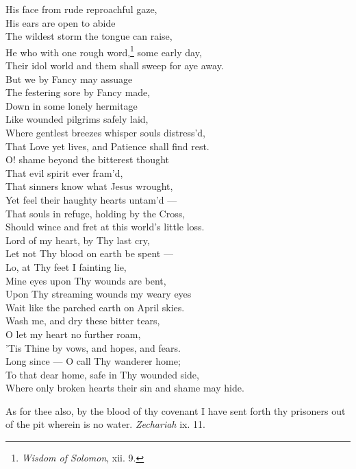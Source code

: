  His face from rude reproachful gaze, \\
 His ears are open to abide \\
 The wildest storm the tongue can raise, \\
 He who with one rough word,\footnote{\emph{Wisdom of Solomon}, xii. 9.} some early day, \\
 Their idol world and them shall sweep for aye away. \\
  But we by Fancy may assuage \\
 The festering sore by Fancy made, \\
 Down in some lonely hermitage \\
 Like wounded pilgrims safely laid, \\
 Where gentlest breezes whisper souls distress’d, \\
 That Love yet lives, and Patience shall find rest. \\
  O! shame beyond the bitterest thought \\
 That evil spirit ever fram’d, \\
 That sinners know what Jesus wrought, \\
 Yet feel their haughty hearts untam’d — \\
 That souls in refuge, holding by the Cross, \\
 Should wince and fret at this world’s little loss. \\
  Lord of my heart, by Thy last cry, \\
 Let not Thy blood on earth be spent — \\
 Lo, at Thy feet I fainting lie, \\
 Mine eyes upon Thy wounds are bent, \\
 Upon Thy streaming wounds my weary eyes \\
 Wait like the parched earth on April skies. \\
  Wash me, and dry these bitter tears, \\
 O let my heart no further roam, \\
 ’Tis Thine by vows, and hopes, and fears. \\
 Long since — O call Thy wanderer home; \\
 To that dear home, safe in Thy wounded side, \\
 Where only broken hearts their sin and shame may hide.\\


As for thee also, by the blood of thy covenant I have sent forth thy prisoners out of the pit wherein is no water. \emph{Zechariah} ix. 11.

